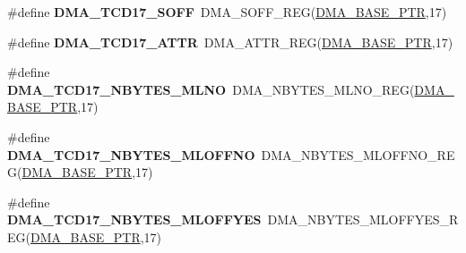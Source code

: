 \begin{DoxyCompactItemize}
\item 
\hypertarget{group___d_m_a___register___accessor___macros_ga31b38ada862c13e61f1303ebe6ea253e}{}\#define {\bfseries D\+M\+A\+\_\+\+T\+C\+D17\+\_\+\+S\+O\+F\+F}~D\+M\+A\+\_\+\+S\+O\+F\+F\+\_\+\+R\+E\+G(\hyperlink{group___d_m_a___peripheral_ga6997fbc1b1973e9f27170217a3bd6f22}{D\+M\+A\+\_\+\+B\+A\+S\+E\+\_\+\+P\+T\+R},17)\label{group___d_m_a___register___accessor___macros_ga31b38ada862c13e61f1303ebe6ea253e}

\item 
\hypertarget{group___d_m_a___register___accessor___macros_gac1a0ae3b413fb57513d91f9e9527cee4}{}\#define {\bfseries D\+M\+A\+\_\+\+T\+C\+D17\+\_\+\+A\+T\+T\+R}~D\+M\+A\+\_\+\+A\+T\+T\+R\+\_\+\+R\+E\+G(\hyperlink{group___d_m_a___peripheral_ga6997fbc1b1973e9f27170217a3bd6f22}{D\+M\+A\+\_\+\+B\+A\+S\+E\+\_\+\+P\+T\+R},17)\label{group___d_m_a___register___accessor___macros_gac1a0ae3b413fb57513d91f9e9527cee4}

\item 
\hypertarget{group___d_m_a___register___accessor___macros_gac9a6ea5a8ebe17fd0a2d22af80a42f26}{}\#define {\bfseries D\+M\+A\+\_\+\+T\+C\+D17\+\_\+\+N\+B\+Y\+T\+E\+S\+\_\+\+M\+L\+N\+O}~D\+M\+A\+\_\+\+N\+B\+Y\+T\+E\+S\+\_\+\+M\+L\+N\+O\+\_\+\+R\+E\+G(\hyperlink{group___d_m_a___peripheral_ga6997fbc1b1973e9f27170217a3bd6f22}{D\+M\+A\+\_\+\+B\+A\+S\+E\+\_\+\+P\+T\+R},17)\label{group___d_m_a___register___accessor___macros_gac9a6ea5a8ebe17fd0a2d22af80a42f26}

\item 
\hypertarget{group___d_m_a___register___accessor___macros_gae97f1131526ea1719e7e6a0895e63cef}{}\#define {\bfseries D\+M\+A\+\_\+\+T\+C\+D17\+\_\+\+N\+B\+Y\+T\+E\+S\+\_\+\+M\+L\+O\+F\+F\+N\+O}~D\+M\+A\+\_\+\+N\+B\+Y\+T\+E\+S\+\_\+\+M\+L\+O\+F\+F\+N\+O\+\_\+\+R\+E\+G(\hyperlink{group___d_m_a___peripheral_ga6997fbc1b1973e9f27170217a3bd6f22}{D\+M\+A\+\_\+\+B\+A\+S\+E\+\_\+\+P\+T\+R},17)\label{group___d_m_a___register___accessor___macros_gae97f1131526ea1719e7e6a0895e63cef}

\item 
\hypertarget{group___d_m_a___register___accessor___macros_ga581b47c54dac3978e661ff55a1cf602b}{}\#define {\bfseries D\+M\+A\+\_\+\+T\+C\+D17\+\_\+\+N\+B\+Y\+T\+E\+S\+\_\+\+M\+L\+O\+F\+F\+Y\+E\+S}~D\+M\+A\+\_\+\+N\+B\+Y\+T\+E\+S\+\_\+\+M\+L\+O\+F\+F\+Y\+E\+S\+\_\+\+R\+E\+G(\hyperlink{group___d_m_a___peripheral_ga6997fbc1b1973e9f27170217a3bd6f22}{D\+M\+A\+\_\+\+B\+A\+S\+E\+\_\+\+P\+T\+R},17)\label{group___d_m_a___register___accessor___macros_ga581b47c54dac3978e661ff55a1cf602b}


\end{DoxyCompactItemize}
